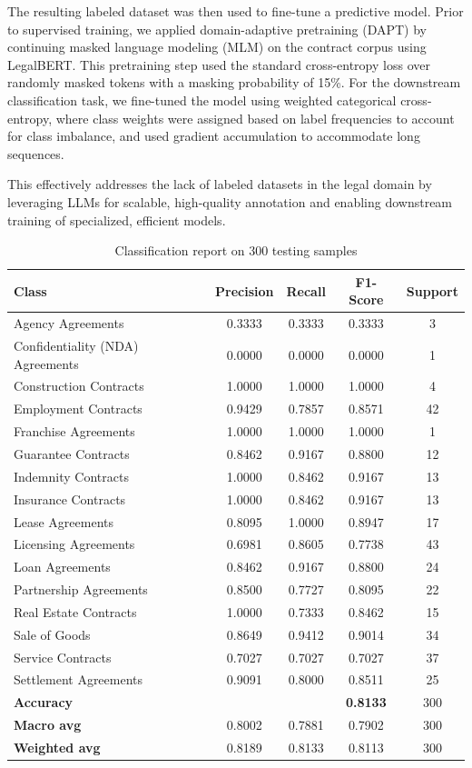 \documentclass{article}
\begin{document}
The resulting labeled dataset was then used to fine-tune a predictive model. Prior to supervised training, we applied domain-adaptive pretraining (DAPT) by continuing masked language modeling (MLM) on the contract corpus using LegalBERT. This pretraining step used the standard cross-entropy loss over randomly masked tokens with a masking probability of 15\%. For the downstream classification task, we fine-tuned the model using weighted categorical cross-entropy, where class weights were assigned based on label frequencies to account for class imbalance, and used gradient accumulation to accommodate long sequences.

This effectively addresses the lack of labeled datasets in the legal domain by leveraging LLMs for scalable, high-quality annotation and enabling downstream training of specialized, efficient models.

\begin{table}[htbp]
\centering
\caption{Classification report on 300 testing samples}
\begin{tabular}{lcccc}
\hline
\textbf{Class} & \textbf{Precision} & \textbf{Recall} & \textbf{F1-Score} & \textbf{Support} \\
\hline
Agency Agreements & 0.3333 & 0.3333 & 0.3333 & 3 \\
Confidentiality (NDA) Agreements & 0.0000 & 0.0000 & 0.0000 & 1 \\
Construction Contracts & 1.0000 & 1.0000 & 1.0000 & 4 \\
Employment Contracts & 0.9429 & 0.7857 & 0.8571 & 42 \\
Franchise Agreements & 1.0000 & 1.0000 & 1.0000 & 1 \\
Guarantee Contracts & 0.8462 & 0.9167 & 0.8800 & 12 \\
Indemnity Contracts & 1.0000 & 0.8462 & 0.9167 & 13 \\
Insurance Contracts & 1.0000 & 0.8462 & 0.9167 & 13 \\
Lease Agreements & 0.8095 & 1.0000 & 0.8947 & 17 \\
Licensing Agreements & 0.6981 & 0.8605 & 0.7738 & 43 \\
Loan Agreements & 0.8462 & 0.9167 & 0.8800 & 24 \\
Partnership Agreements & 0.8500 & 0.7727 & 0.8095 & 22 \\
Real Estate Contracts & 1.0000 & 0.7333 & 0.8462 & 15 \\
Sale of Goods & 0.8649 & 0.9412 & 0.9014 & 34 \\
Service Contracts & 0.7027 & 0.7027 & 0.7027 & 37 \\
Settlement Agreements & 0.9091 & 0.8000 & 0.8511 & 25 \\
\hline
\textbf{Accuracy} & & & \textbf{0.8133} & 300 \\
\textbf{Macro avg} & 0.8002 & 0.7881 & 0.7902 & 300 \\
\textbf{Weighted avg} & 0.8189 & 0.8133 & 0.8113 & 300 \\
\hline
\end{tabular}
\label{tab:classification_report}
\end{table}




\end{document}
